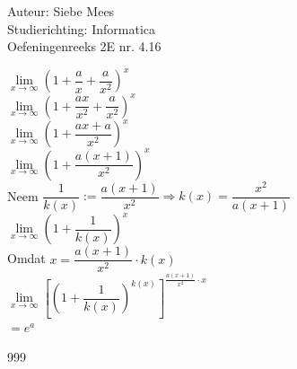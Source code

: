 \documentclass[a4paper]{article}
\begin{document}
  
\noindent \large Auteur: Siebe Mees \\
\noindent \large Studierichting: Informatica \\
\noindent \large Oefeningenreeks 2E nr. 4.16 \\

\medskip

\normalsize

$ \lim\limits_{x \rightarrow \infty} \left(1+\dfrac{a}{x} + \dfrac{a}{x^2}\right)^x $ \\

$ \lim\limits_{x \rightarrow \infty} \left(1+\dfrac{ax}{x^2} + \dfrac{a}{x^2}\right)^x $ \\

$ \lim\limits_{x \rightarrow \infty} \left(1+\dfrac{ax+a}{x^2} \right)^x $ \\

$ \lim\limits_{x \rightarrow \infty} \left(1+\dfrac{a(x+1)}{x^2} \right)^x $ \\

Neem $ \dfrac{1}{k(x)} := \dfrac{a(x+1)}{x^2} \Rightarrow k(x) = \dfrac{x^2}{a(x+1)} $ \\

$ \lim\limits_{x \rightarrow \infty} \left(1+\dfrac{1}{k(x)} \right)^x $ \\

Omdat $ x = \dfrac{a(x+1)}{x^2} \cdot k(x) $ \\

$ \lim\limits_{x \rightarrow \infty} \left[(1+\dfrac{1}{k(x)})^{k(x)} \right]^{\tfrac{a(x+1)}{x^2}\cdot x} $ \\

$ = e^a $ \\


\begin{thebibliography}{999}
\end{thebibliography}
\end{document}
